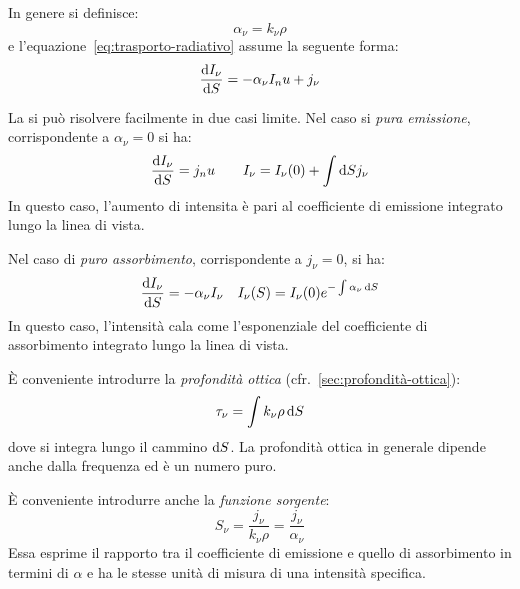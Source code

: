 In genere si definisce:
\[
\alpha_\nu = k_\nu \rho
\]
e l'equazione~\eqref{eq:trasporto-radiativo} assume la seguente forma:
\begin{equation}\label{eq:trasporto-radiativo2}
    \frac{\mathop{\mathrm{{}d}}\mathopen{} I_\nu}{\mathop{\mathrm{{}d}}\mathopen{} S} = -\alpha_\nu I_nu + j_\nu
\end{equation}

La si può risolvere facilmente in due casi limite. Nel caso si \emph{pura emissione}, corrispondente a $\alpha_\nu = 0$ si ha:
\[
    \frac{\mathop{\mathrm{{}d}}\mathopen{} I_\nu}{\mathop{\mathrm{{}d}}\mathopen{} S} = j_nu \qquad I_\nu = I_\nu (0) + \int \mathop{\mathrm{{}d}}\mathopen{} S j_\nu
\]
In questo caso, l'aumento di intensita è pari al coefficiente di emissione integrato lungo la linea di vista.

Nel caso di \emph{puro assorbimento}, corrispondente a $j_\nu = 0$, si ha:
\[
\frac{\mathop{\mathrm{{}d}}\mathopen{} I_\nu}{\mathop{\mathrm{{}d}}\mathopen{} S} = -\alpha_\nu I_\nu \quad 
I_\nu (S) = I_\nu (0) e^{-\int \alpha_\nu \mathop{\mathrm{{}d}}\mathopen{} S}
\]
In questo caso, l'intensità cala come l'esponenziale del coefficiente di assorbimento integrato lungo la linea di vista.

È conveniente introdurre la \emph{profondità ottica} (cfr.~\ref{sec:profondità-ottica}):
\begin{equation}\label{eq:profondità-ottica}
        \tau_\nu = \int k_\nu \rho \mathop{\mathrm{{}d}}\mathopen{} S
\end{equation}
dove si integra lungo il cammino $\mathop{\mathrm{{}d}}\mathopen{} S$. La profondità ottica in generale dipende anche dalla frequenza ed è un numero puro. 

È conveniente introdurre anche la \emph{funzione sorgente}:
\begin{equation}\label{eq:funzione-sorgente}
    S_\nu = \frac{j_\nu}{k_\nu \rho} = \frac{j_\nu}{\alpha_\nu}
\end{equation}
Essa esprime il rapporto tra il coefficiente di emissione e quello di assorbimento in termini di $\alpha$ e ha le stesse unità di misura di una intensità specifica.

